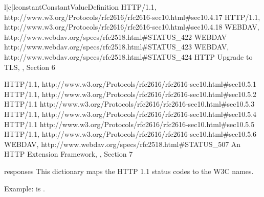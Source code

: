 \begin{tableiii}{l|c|l}{constant}{Constant}{Value}{Definition}
    {HTTP/1.1, 
      {http://www.w3.org/Protocols/rfc2616/rfc2616-sec10.html#sec10.4.17}}
    {HTTP/1.1, 
      {http://www.w3.org/Protocols/rfc2616/rfc2616-sec10.html#sec10.4.18}}
    {WEBDAV, 
      {http://www.webdav.org/specs/rfc2518.html#STATUS_422}}
    {WEBDAV 
      {http://www.webdav.org/specs/rfc2518.html#STATUS_423}}
    {WEBDAV, 
      {http://www.webdav.org/specs/rfc2518.html#STATUS_424}}
    {HTTP Upgrade to TLS, , Section 6}

    {HTTP/1.1, 
      {http://www.w3.org/Protocols/rfc2616/rfc2616-sec10.html#sec10.5.1}}
    {HTTP/1.1, 
      {http://www.w3.org/Protocols/rfc2616/rfc2616-sec10.html#sec10.5.2}}
    {HTTP/1.1 
      {http://www.w3.org/Protocols/rfc2616/rfc2616-sec10.html#sec10.5.3}}
    {HTTP/1.1, 
      {http://www.w3.org/Protocols/rfc2616/rfc2616-sec10.html#sec10.5.4}}
    {HTTP/1.1 
      {http://www.w3.org/Protocols/rfc2616/rfc2616-sec10.html#sec10.5.5}}
    {HTTP/1.1, 
      {http://www.w3.org/Protocols/rfc2616/rfc2616-sec10.html#sec10.5.6}}
    {WEBDAV, 
      {http://www.webdav.org/specs/rfc2518.html#STATUS_507}}
    {An HTTP Extension Framework, , Section 7}
\end{tableiii}

\begin{datadesc}{responses}
This dictionary maps the HTTP 1.1 status codes to the W3C names.

Example:  is .
\end{datadesc}


